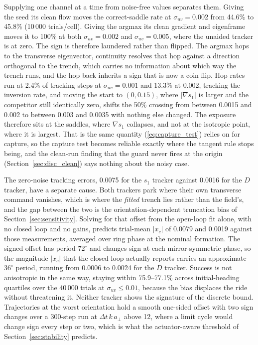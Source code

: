 \documentclass[lettersize,journal]{IEEEtran}
\begin{document}
Supplying one channel at a time from noise-free values separates them.
Giving the seed its clean flow moves the correct-saddle rate at
$\sigma_{uv} = 0.002$ from 44.6\% to 45.8\% (10\,000 trials/cell). Giving
the argmax its clean gradient and eigenframe moves it to 100\% at both
$\sigma_{uv} = 0.002$ and $\sigma_{uv} = 0.005$, where the unaided tracker
is at zero. The sign is therefore
laundered rather than flipped. The argmax hops to the transverse
eigenvector, continuity resolves that hop against a direction orthogonal
to the trench, which carries no information about which way the trench
runs, and the hop back inherits a sign that is now a coin flip. Hop rates
run at 2.4\% of tracking steps at $\sigma_{uv} = 0.001$ and 13.3\% at
0.002, tracking the inversion rate, and moving the start to $(0, 0.15)$,
where $|\nabla s_1|$ is larger and the competitor still identically zero,
shifts the 50\% crossing from between 0.0015 and 0.002 to between 0.003
and 0.0035 with nothing else changed. The exposure therefore sits at the
saddles, where $\nabla s_1$ collapses, and not at the isotropic point,
where it is largest. That is the same quantity
(\ref{eq:capture_test}) relies on for capture, so the capture test
becomes reliable exactly where the tangent rule stops being, and the
clean-run finding that the guard never fires at the origin
(Section~\ref{sec:disc_clean}) says nothing about the noisy case.

The zero-noise tracking errors, 0.0075 for the $s_1$ tracker against
0.0016 for the $D$ tracker, have a separate cause. Both trackers park
where their own transverse command vanishes, which is where the
\emph{fitted} trench lies rather than the field's, and the gap between
the two is the orientation-dependent truncation bias of
Section~\ref{sec:sensitivity}. Solving for that offset from the
open-loop fit alone, with no closed loop and no gains, predicts
trial-mean $|x_c|$ of 0.0079 and 0.0019 against those measurements,
averaged over ring phase at the nominal formation. The signed offset has
period $72^\circ$ and changes sign at each mirror-symmetric phase, so the
magnitude $|x_c|$ that the closed loop actually reports carries an
approximate $36^\circ$ period, running from 0.0006 to 0.0024 for the $D$
tracker. Success is not anisotropic in the same way, staying within
75.9--77.1\% across initial-heading quartiles over the 40\,000 trials at
$\sigma_{uv} \leq 0.01$, because the bias displaces the ride without
threatening it. Neither tracker shows the signature of the discrete
bound. Trajectories at the worst orientation hold a smooth one-sided
offset with two sign changes over a 300-step run at $\Delta t\,k\,a_\perp$
above 12, where a limit cycle would change sign every step or two, which
is what the actuator-aware threshold of Section~\ref{sec:stability}
predicts.
\end{document}
